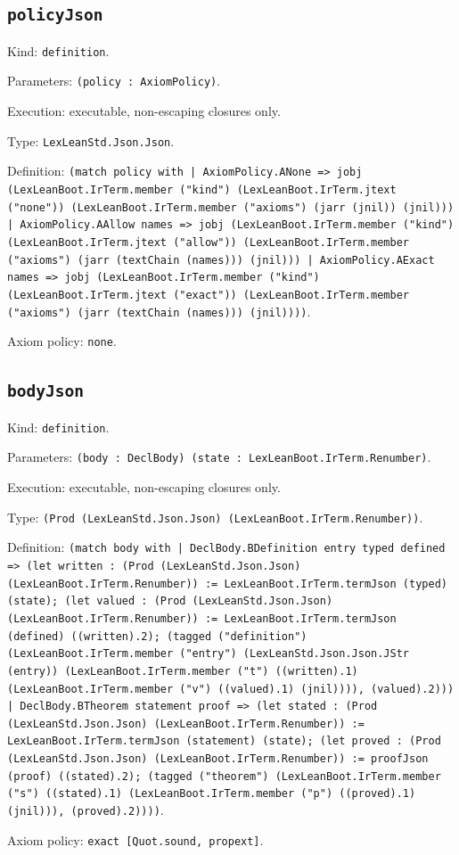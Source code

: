 \documentclass[11pt]{article}
\begin{document}
\subsection*{\texttt{policyJson}}
\noindent Kind: \texttt{definition}.\par
\noindent Parameters: \texttt{(policy : AxiomPolicy)}.\par
\noindent Execution: executable, non-escaping closures only.\par
\noindent Type: \texttt{LexLeanStd.Json.Json}.\par
\noindent Definition: \texttt{(match policy with | AxiomPolicy.ANone => jobj (LexLeanBoot.IrTerm.member ("kind") (LexLeanBoot.IrTerm.jtext ("none")) (LexLeanBoot.IrTerm.member ("axioms") (jarr (jnil)) (jnil))) | AxiomPolicy.AAllow names => jobj (LexLeanBoot.IrTerm.member ("kind") (LexLeanBoot.IrTerm.jtext ("allow")) (LexLeanBoot.IrTerm.member ("axioms") (jarr (textChain (names))) (jnil))) | AxiomPolicy.AExact names => jobj (LexLeanBoot.IrTerm.member ("kind") (LexLeanBoot.IrTerm.jtext ("exact")) (LexLeanBoot.IrTerm.member ("axioms") (jarr (textChain (names))) (jnil))))}.\par
\noindent Axiom policy: \texttt{none}.\par
\subsection*{\texttt{bodyJson}}
\noindent Kind: \texttt{definition}.\par
\noindent Parameters: \texttt{(body : DeclBody) (state : LexLeanBoot.IrTerm.Renumber)}.\par
\noindent Execution: executable, non-escaping closures only.\par
\noindent Type: \texttt{(Prod (LexLeanStd.Json.Json) (LexLeanBoot.IrTerm.Renumber))}.\par
\noindent Definition: \texttt{(match body with | DeclBody.BDefinition entry typed defined => (let written : (Prod (LexLeanStd.Json.Json) (LexLeanBoot.IrTerm.Renumber)) := LexLeanBoot.IrTerm.termJson (typed) (state); (let valued : (Prod (LexLeanStd.Json.Json) (LexLeanBoot.IrTerm.Renumber)) := LexLeanBoot.IrTerm.termJson (defined) ((written).2); (tagged ("definition") (LexLeanBoot.IrTerm.member ("entry") (LexLeanStd.Json.Json.JStr (entry)) (LexLeanBoot.IrTerm.member ("t") ((written).1) (LexLeanBoot.IrTerm.member ("v") ((valued).1) (jnil)))), (valued).2))) | DeclBody.BTheorem statement proof => (let stated : (Prod (LexLeanStd.Json.Json) (LexLeanBoot.IrTerm.Renumber)) := LexLeanBoot.IrTerm.termJson (statement) (state); (let proved : (Prod (LexLeanStd.Json.Json) (LexLeanBoot.IrTerm.Renumber)) := proofJson (proof) ((stated).2); (tagged ("theorem") (LexLeanBoot.IrTerm.member ("s") ((stated).1) (LexLeanBoot.IrTerm.member ("p") ((proved).1) (jnil))), (proved).2))))}.\par
\noindent Axiom policy: \texttt{exact [Quot.sound, propext]}.\par
\end{document}
